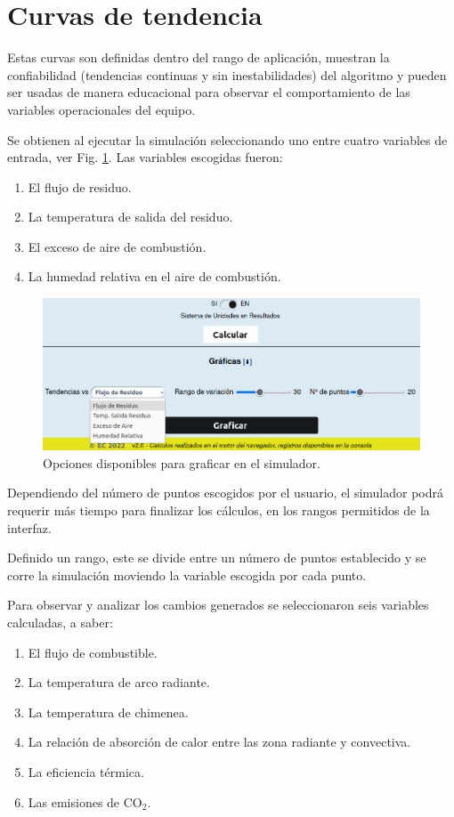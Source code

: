 \section{Curvas de tendencia}
\par Estas curvas son definidas dentro del rango de aplicación, muestran la confiabilidad (tendencias continuas y sin inestabilidades) del algoritmo y pueden ser usadas de manera educacional para observar el comportamiento de las variables operacionales del equipo.
\par Se obtienen al ejecutar la simulación seleccionando uno entre cuatro variables de entrada, ver Fig. \ref{fig:curvas}. Las variables escogidas fueron:
\begin{enumerate}
    \item El flujo de residuo.
    \item La temperatura de salida del residuo.
    \item El exceso de aire de combustión.
    \item La humedad relativa en el aire de combustión.
\end{enumerate}
\begin{figure}[H]\begin{center}
\includegraphics[scale=0.48]{images/curvas}
\caption[Opciones disponibles para graficar en el simulador]{Opciones disponibles para graficar en el simulador.}
\label{fig:curvas}\end{center}\end{figure}
\par Dependiendo del número de puntos escogidos por el usuario, el simulador podrá requerir más tiempo para finalizar los cálculos, en los rangos permitidos de la interfaz.
\par Definido un rango, este se divide entre un número de puntos establecido y se corre la simulación moviendo la variable escogida por cada punto.
\par Para observar y analizar los cambios generados se seleccionaron seis variables calculadas, a saber:
\begin{enumerate}
    \item El flujo de combustible.
    \item La temperatura de arco radiante.
    \item La temperatura de chimenea.
    \item La relación de absorción de calor entre las zona radiante y convectiva.
    \item La eficiencia térmica.
    \item Las emisiones de CO$_2$.
\end{enumerate}

